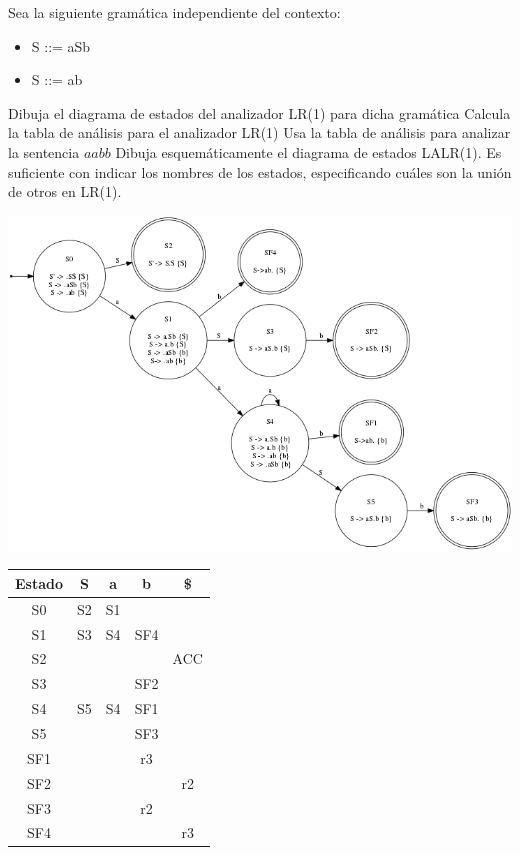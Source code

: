 \begin{problem}
Sea la siguiente gramática independiente del contexto:
\begin{itemize}
\item S ::= aSb
\item S ::= ab
\end{itemize}
\ppart Dibuja el diagrama de estados del analizador LR(1) para dicha gramática
\ppart Calcula la tabla de análisis para el analizador LR(1)
\ppart Usa la tabla de análisis para analizar la sentencia $aabb$
\ppart Dibuja esquemáticamente el diagrama de estados LALR(1). Es suficiente con indicar los nombres de los estados, especificando cuáles son la unión de otros en LR(1).
\solution
\ppart
\begin{center}
\includegraphics[scale=0.65]{tex/ejerciciosHoja3/automata_H3E8.png}
\end{center}

\ppart
\begin{tabular}{| c | c | c | c | c |}
\hline
Estado & S & a & b & \$\\
\hline
S0 & S2 & S1 & & \\
\hline
S1 & S3 & S4 & SF4 & \\
\hline
S2 & & & & ACC \\
\hline
S3 & & & SF2 & \\
\hline
S4 & S5 & S4 & SF1 & \\
\hline
S5 & & & SF3 & \\
\hline
SF1 & & & r3 & \\
\hline
SF2 & & & & r2\\
\hline
SF3 & & & r2 & \\
\hline
SF4 & & & & r3 \\
\hline
\end{tabular}


\end{problem}
